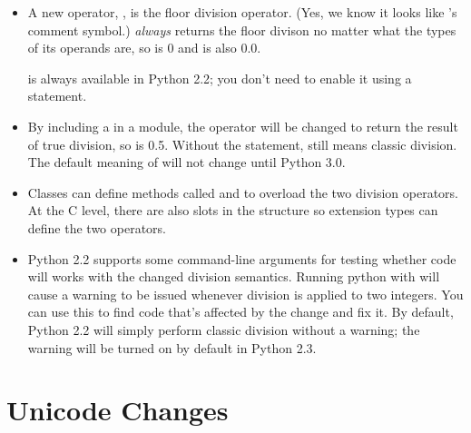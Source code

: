\documentclass{howto}
\begin{document}
\begin{itemize}

\item A new operator, \code{//}, is the floor division operator.
(Yes, we know it looks like \Cpp's comment symbol.)  \code{//}
\emph{always} returns the floor divison no matter what the types of
its operands are, so  is 0 and  is also
0.0.

\code{//} is always available in Python 2.2; you don't need to enable
it using a  statement.  

\item By including a  in a
module, the \code{/} operator will be changed to return the result of
true division, so  is 0.5.  Without the 
statement, \code{/} still means classic division.  The default meaning
of \code{/} will not change until Python 3.0.  

\item Classes can define methods called  and
 to overload the two division operators.  At the
C level, there are also slots in the  structure
so extension types can define the two operators.

\item Python 2.2 supports some command-line arguments for testing
whether code will works with the changed division semantics.  Running
python with  will cause a warning to be issued
whenever division is applied to two integers.  You can use this to
find code that's affected by the change and fix it.  By default,
Python 2.2 will simply perform classic division without a warning; the
warning will be turned on by default in Python 2.3.

\end{itemize}

\begin{seealso}


\end{seealso}


\section{Unicode Changes}
\end{document}
